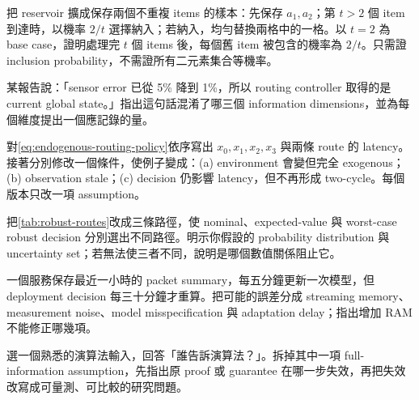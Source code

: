 \documentclass[11pt,a4paper,oneside,openany]{book}
\begin{document}
\begin{exercise}
把 reservoir 擴成保存兩個不重複 items 的樣本：先保存 $a_1,a_2$；第 $t>2$ 個 item 到達時，以機率 $2/t$ 選擇納入；若納入，均勻替換兩格中的一格。以 $t=2$ 為 base case，證明處理完 $t$ 個 items 後，每個舊 item 被包含的機率為 $2/t$。只需證 inclusion probability，不需證所有二元素集合等機率。
\end{exercise}

\begin{exercise}
某報告說：「sensor error 已從 5\% 降到 1\%，所以 routing controller 取得的是 current global state。」指出這句話混淆了哪三個 information dimensions，並為每個維度提出一個應記錄的量。
\end{exercise}

\begin{exercise}
對\cref{eq:endogenous-routing-policy}依序寫出 $x_0,x_1,x_2,x_3$ 與兩條 route 的 latency。接著分別修改一個條件，使例子變成：(a) environment 會變但完全 exogenous；(b) observation stale；(c) decision 仍影響 latency，但不再形成 two-cycle。每個版本只改一項 assumption。
\end{exercise}

\begin{exercise}
把\cref{tab:robust-routes}改成三條路徑，使 nominal、expected-value 與 worst-case robust decision 分別選出不同路徑。明示你假設的 probability distribution 與 uncertainty set；若無法使三者不同，說明是哪個數值關係阻止它。
\end{exercise}

\begin{exercise}
一個服務保存最近一小時的 packet summary，每五分鐘更新一次模型，但 deployment decision 每三十分鐘才重算。把可能的誤差分成 streaming memory、measurement noise、model misspecification 與 adaptation delay；指出增加 RAM 不能修正哪幾項。
\end{exercise}

\begin{exercise}
選一個熟悉的演算法輸入，回答「誰告訴演算法？」。拆掉其中一項 full-information assumption，先指出原 proof 或 guarantee 在哪一步失效，再把失效改寫成可量測、可比較的研究問題。
\end{exercise}
\end{document}
